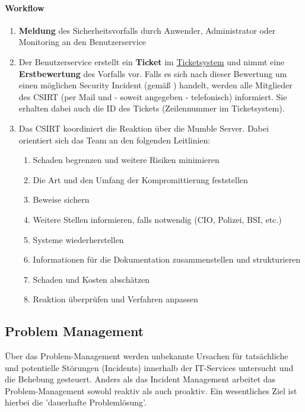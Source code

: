 \documentclass[]{article}
\let\oldparagraph\paragraph
\renewcommand{\paragraph}[1]{\oldparagraph{#1}\mbox{}}
\begin{document}
\paragraph{Workflow}\label{workflow-2}

\begin{enumerate}
\def\labelenumi{\arabic{enumi}.}
\item
  \textbf{Meldung} des Sicherheitsvorfalls durch Anwender, Administrator
  oder Monitoring an den Benutzerservice
\item
  Der Benutzerservice erstellt ein \textbf{Ticket} im
  \href{https://docs.google.com/spreadsheets/d/1GDq3AEsVDu1a-X7tEl6qKDtSZdAXm8lsRzY6Ijw-dUQ/edit\#gid=0}{Ticketsystem}
  und nimmt eine \textbf{Erstbewertung} des Vorfalls vor. Falls es sich
  nach dieser Bewertung um einen möglichen Security Incident (gemäß )
  handelt, werden alle Mitglieder des CSIRT (per Mail und - soweit
  angegeben - telefonisch) informiert. Sie erhalten dabei auch die ID
  des Tickets (Zeilennummer im Ticketsystem).
\item
  Das CSIRT koordiniert die Reaktion über die Mumble Server. Dabei
  orientiert sich das Team an den folgenden Leitlinien:

  \begin{enumerate}
  \def\labelenumii{\alph{enumii}.}
  \item
    Schaden begrenzen und weitere Risiken minimieren
  \item
    Die Art und den Umfang der Kompromittierung feststellen
  \item
    Beweise sichern
  \item
    Weitere Stellen informieren, falls notwendig (CIO, Polizei, BSI,
    etc.)
  \item
    Systeme wiederherstellen
  \item
    Informationen für die Dokumentation zusammenstellen und
    strukturieren
  \item
    Schaden und Kosten abschätzen
  \item
    Reaktion überprüfen und Verfahren anpassen
  \end{enumerate}
\end{enumerate}

\subsection{Problem Management}\label{problem-management}

Über das Problem-Management werden unbekannte Ursachen für tatsächliche
und potentielle Störungen (Incidents) innerhalb der IT-Services
untersucht und die Behebung gesteuert. Anders als das Incident
Management arbeitet das Problem-Management sowohl reaktiv als auch
proaktiv. Ein wesentliches Ziel ist hierbei die 'dauerhafte
Problemlösung'.
\end{document}
